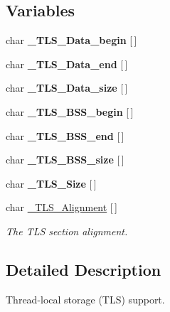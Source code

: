\subsection*{Variables}
\begin{DoxyCompactItemize}
\item 
\mbox{\label{group__RTEMSScoreTLS_ga05100453677ebeffaea18ceafe501bd6}} 
char {\bfseries \+\_\+\+T\+L\+S\+\_\+\+Data\+\_\+begin} \mbox{[}$\,$\mbox{]}
\item 
\mbox{\label{group__RTEMSScoreTLS_gae1e708eae7c25c4316686bf813e1af1a}} 
char {\bfseries \+\_\+\+T\+L\+S\+\_\+\+Data\+\_\+end} \mbox{[}$\,$\mbox{]}
\item 
\mbox{\label{group__RTEMSScoreTLS_gaeb87fd405def8d2d62cc79740753e800}} 
char {\bfseries \+\_\+\+T\+L\+S\+\_\+\+Data\+\_\+size} \mbox{[}$\,$\mbox{]}
\item 
\mbox{\label{group__RTEMSScoreTLS_ga353e24ef01a1b73ec326cbcad269604a}} 
char {\bfseries \+\_\+\+T\+L\+S\+\_\+\+B\+S\+S\+\_\+begin} \mbox{[}$\,$\mbox{]}
\item 
\mbox{\label{group__RTEMSScoreTLS_ga900db9daca6c09f7202b3a5acd5f1706}} 
char {\bfseries \+\_\+\+T\+L\+S\+\_\+\+B\+S\+S\+\_\+end} \mbox{[}$\,$\mbox{]}
\item 
\mbox{\label{group__RTEMSScoreTLS_gae9cc0577469dfb898280d485f086ecf9}} 
char {\bfseries \+\_\+\+T\+L\+S\+\_\+\+B\+S\+S\+\_\+size} \mbox{[}$\,$\mbox{]}
\item 
\mbox{\label{group__RTEMSScoreTLS_ga31f90d3f927169b2c8189178eb00be30}} 
char {\bfseries \+\_\+\+T\+L\+S\+\_\+\+Size} \mbox{[}$\,$\mbox{]}
\item 
char \mbox{\hyperlink{group__RTEMSScoreTLS_ga1d89186d2fe1619171ff1987d032cf6b}{\+\_\+\+T\+L\+S\+\_\+\+Alignment}} \mbox{[}$\,$\mbox{]}
\begin{DoxyCompactList}\small\item\em The T\+LS section alignment. \end{DoxyCompactList}\end{DoxyCompactItemize}


\subsection{Detailed Description}
Thread-\/local storage (T\+LS) support. 

